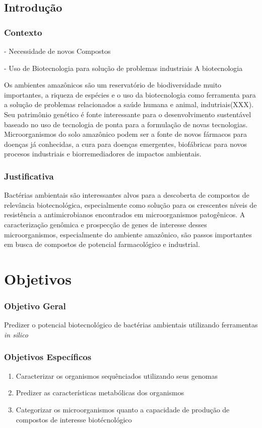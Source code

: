\section{Introdução}
\label{cap:introducao}

\subsection{Contexto}


- Necessidade de novos Compostos

- Uso de Biotecnologia para solução de problemas industriais
A biotecnologia 

Os ambientes amazônicos são um reservatório de biodiversidade muito importantes,
a riqueza de espécies e o uso da biotecnologia como ferramenta para a solução de problemas relacionados
a saúde humana e animal, indutriais(XXX). Seu patrimônio genético é fonte interessante para o
desenvolvimento sustentável baseado no uso de tecnologia de ponta para a formulação de novas tecnologias.
Microorganismos do solo amazônico podem ser a fonte de novos fármacos para doenças já conhecidas,
a cura para doenças emergentes, biofábricas para novos procesos industriais e biorremediadores
de impactos ambientais.

\subsection{Justificativa}
Bactérias ambientais são interessantes alvos para a descoberta de compostos
de relevância biotecnológica, especialmente como solução para os crescentes níveis
de resistência a antimicrobianos encontrados em microorganismos patogênicos.
A caracterização genômica e prospecção de genes de interesse desses microorganismos,
especialmente do ambiente amazônico, são passos importantes
em busca de compostos de potencial farmacológico e industrial.

\chapter{Objetivos}

\subsection{Objetivo Geral}

Predizer o potencial biotecnológico de bactérias ambientais utilizando 
ferramentas \textit{in silico} 

\subsection{Objetivos Específicos}
\begin{enumerate}
    \item Caracterizar os organismos sequênciados utilizando seus genomas
    \item Predizer as características metabólicas dos organismos
    \item Categorizar os microorganismos quanto a capacidade de produção de compostos de interesse biotécnológico
\end{enumerate}





